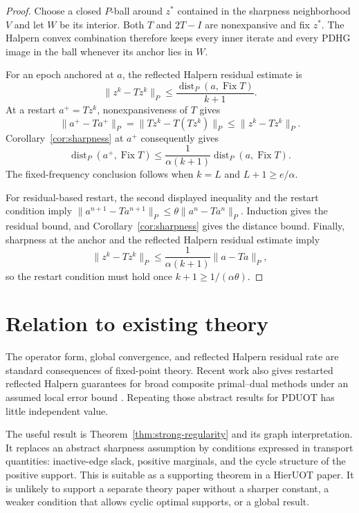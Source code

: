 \documentclass[11pt]{article}
\newcommand{\dist}{\operatorname{dist}}
\newcommand{\Fix}{\operatorname{Fix}}
\begin{document}
\begin{proof}
Choose a closed $P$-ball around $z^*$ contained in the sharpness neighborhood $V$ and let $W$ be its interior.
Both $T$ and $2T-I$ are nonexpansive and fix $z^*$.
The Halpern convex combination therefore keeps every inner iterate and every PDHG image in the ball whenever its anchor lies in $W$.

For an epoch anchored at $a$, the reflected Halpern residual estimate is
$$\lVert z^k-Tz^k\rVert_P\leq\frac{\dist_P(a,\Fix T)}{k+1}.$$
At a restart $a^+=Tz^k$, nonexpansiveness of $T$ gives
$$\lVert a^+-Ta^+\rVert_P=\lVert Tz^k-T(Tz^k)\rVert_P\leq\lVert z^k-Tz^k\rVert_P.$$
Corollary~\ref{cor:sharpness} at $a^+$ consequently gives
$$\dist_P(a^+,\Fix T)\leq\frac{1}{\alpha(k+1)}\dist_P(a,\Fix T).$$
The fixed-frequency conclusion follows when $k=L$ and $L+1\geq e/\alpha$.

For residual-based restart, the second displayed inequality and the restart condition imply $\lVert a^{n+1}-Ta^{n+1}\rVert_P\leq\theta\lVert a^n-Ta^n\rVert_P$.
Induction gives the residual bound, and Corollary~\ref{cor:sharpness} gives the distance bound.
Finally, sharpness at the anchor and the reflected Halpern residual estimate imply
$$\lVert z^k-Tz^k\rVert_P\leq\frac{1}{\alpha(k+1)}\lVert a-Ta\rVert_P,$$
so the restart condition must hold once $k+1\geq1/(\alpha\theta)$.
\end{proof}

\section{Relation to existing theory}

The operator form, global convergence, and reflected Halpern residual rate are standard consequences of fixed-point theory.
Recent work also gives restarted reflected Halpern guarantees for broad composite primal--dual methods under an assumed local error bound \cite{liu2026restarted}.
Repeating those abstract results for PDUOT has little independent value.

The useful result is Theorem~\ref{thm:strong-regularity} and its graph interpretation.
It replaces an abstract sharpness assumption by conditions expressed in transport quantities: inactive-edge slack, positive marginals, and the cycle structure of the positive support.
This is suitable as a supporting theorem in a HierUOT paper.
It is unlikely to support a separate theory paper without a sharper constant, a weaker condition that allows cyclic optimal supports, or a global result.
\end{document}
